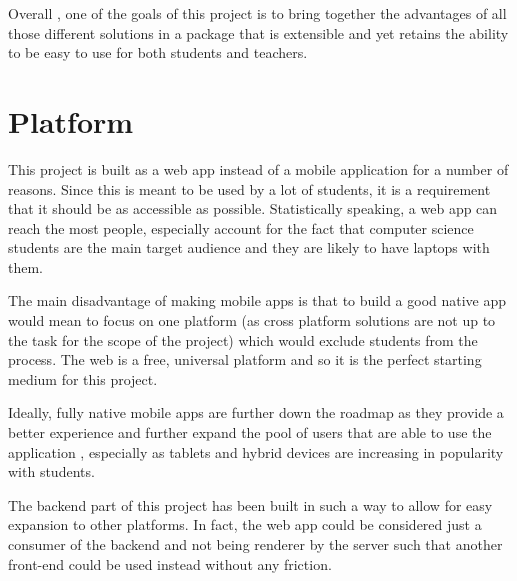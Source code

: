 Overall , one of the goals of this project is to bring together the advantages of all those different solutions in a package that is extensible and yet retains the ability to be easy to use for both students and teachers.


\section{Platform}
This project is built as a web app instead of a mobile application for a number of reasons. Since this is meant to be used by a lot of students, it is a requirement that it should be as accessible as possible. Statistically speaking, a web app can reach the most people, especially account for the fact that computer science students are the main target audience and they are likely to have laptops with them.

The main disadvantage of making mobile apps is that to build a good native app would mean to focus on one platform (as cross platform solutions are not up to the task for the scope of the project) which would exclude students from the process. The web is a free, universal platform and so it is the perfect starting medium for this project.

Ideally, fully native mobile apps are further down the roadmap as they provide a better experience and further expand the pool of users that are able to use the application , especially as tablets and hybrid devices are increasing in popularity with students\cite{tablets}.

The backend part of this project has been built in such a way to allow for easy expansion to other platforms. In fact, the web app could be considered just a consumer of the backend and not being renderer by the server such that another front-end could be used instead without any friction.




















